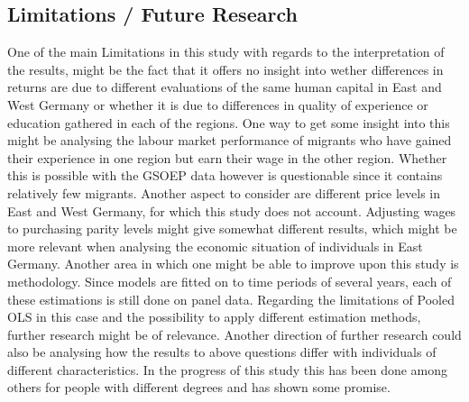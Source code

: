 \subsection{Limitations / Future Research}
One of the main Limitations in this study with regards to the interpretation of the results, might be the fact that it offers no insight into wether differences in returns are due to different evaluations of the same human capital in East and West Germany or whether it is due to differences in quality of experience or education gathered in each of the regions. One way to get some insight into this might be analysing the labour market performance of migrants who have gained their experience in one region but earn their wage in the other region. Whether this is possible with the GSOEP data however is questionable since it contains relatively few migrants. Another aspect to consider are different price levels in East and West Germany, for which this study does not account. Adjusting wages to purchasing parity levels might give somewhat different results, which might be more relevant when analysing the economic situation of individuals in East Germany. Another area in which one might be able to improve upon this study is methodology. Since models are fitted on to time periods of several years, each of these estimations is still done on panel data. Regarding the limitations of Pooled OLS in this case and the possibility to apply different estimation methods, further research might be of relevance. Another direction of further research could also be analysing how the results to above questions differ with individuals of different characteristics. In the progress of this study this has been done among others for people with different degrees and has shown some promise.